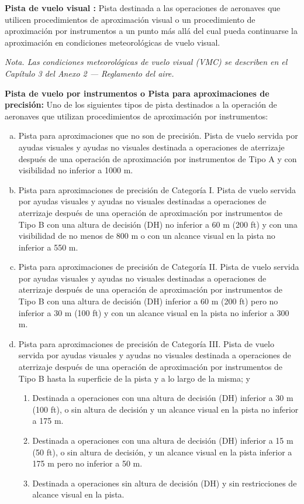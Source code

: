 \begin{tcolorbox}[title={
    OACI. Anexo 14. Edición 2018
  }
  ]
  {\footnotesize
   {\bf  Pista de vuelo visual :} 
    Pista destinada a las operaciones de aeronaves que utilicen procedimientos de aproximación visual
    o un procedimiento de aproximación por instrumentos a un punto más allá del cual pueda continuarse
    la aproximación en condiciones meteorológicas de vuelo visual.

\emph{Nota. Las condiciones meteorológicas de vuelo visual (VMC) se describen en el Capítulo 3 del Anexo 2 — Reglamento
del aire.
}

{\bf Pista de vuelo por instrumentos o Pista para aproximaciones de precisión:} 
   Uno de los siguientes tipos de pista destinados a la operación de aeronaves que utilizan
    procedimientos de aproximación por instrumentos:
    
    \begin{enumerate}[a)]
    \item Pista para aproximaciones que no son de precisión. Pista de vuelo servida por ayudas visuales y ayudas no visuales
destinada a operaciones de aterrizaje después de una operación de aproximación por instrumentos de Tipo A y con
visibilidad no inferior a 1000 m.
\item Pista para aproximaciones de precisión de Categoría I. Pista de vuelo servida por ayudas visuales y ayudas no
visuales destinadas a operaciones de aterrizaje después de una operación de aproximación por instrumentos de Tipo B
con una altura de decisión (DH) no inferior a 60 m (200 ft) y con una visibilidad de no menos de 800 m o con un
alcance visual en la pista no inferior a 550 m.
\item Pista para aproximaciones de precisión de Categoría II. Pista de vuelo servida por ayudas visuales y ayudas no
visuales destinadas a operaciones de aterrizaje después de una operación de aproximación por instrumentos de Tipo B
con una altura de decisión (DH) inferior a 60 m (200 ft) pero no inferior a 30 m (100 ft) y con un alcance visual en la
pista no inferior a 300 m.
\item Pista para aproximaciones de precisión de Categoría III. Pista de vuelo servida por ayudas visuales y ayudas no
visuales destinada a operaciones de aterrizaje después de una operación de aproximación por instrumentos de Tipo B
hasta la superficie de la pista y a lo largo de la misma; y

\begin{enumerate}[A ]
\item Destinada a operaciones con una altura de decisión (DH) inferior a 30 m (100 ft), o sin altura de decisión y un
alcance visual en la pista no inferior a 175 m.
\item Destinada a operaciones con una altura de decisión (DH) inferior a 15 m (50 ft), o sin altura de decisión, y un
alcance visual en la pista inferior a 175 m pero no inferior a 50 m.
\item Destinada a operaciones sin altura de decisión (DH) y sin restricciones de alcance visual en la pista.
\end{enumerate}


\end{enumerate}}
\end{tcolorbox}
